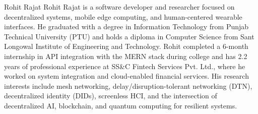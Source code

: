 \documentclass[10pt,journal,compsoc]{IEEEtran}
\begin{document}
\begin{IEEEbiography}{Rohit Rajat}
Rohit Rajat is a software developer and researcher focused on decentralized systems, mobile edge computing, and human-centered wearable interfaces. He graduated with a degree in Information Technology from Punjab Technical University (PTU) and holds a diploma in Computer Science from Sant Longowal Institute of Engineering and Technology. Rohit completed a 6-month internship in API integration with the MERN stack during college and has 2.2 years of professional experience at SS\&C Fintech Services Pvt. Ltd., where he worked on system integration and cloud-enabled financial services. His research interests include mesh networking, delay/disruption-tolerant networking (DTN), decentralized identity (DIDs), screenless HCI, and the intersection of decentralized AI, blockchain, and quantum computing for resilient systems.
\end{IEEEbiography}

\balance
\end{document}
